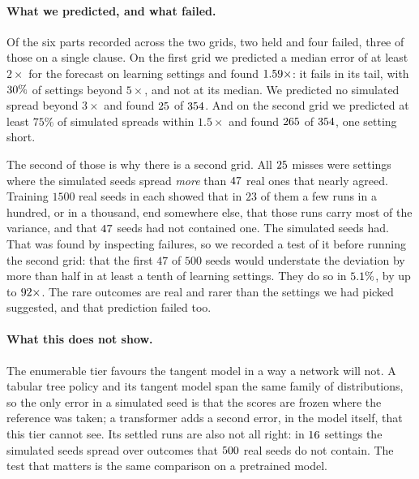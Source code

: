 \paragraph{What we predicted, and what failed.} Of the six parts recorded across the two
grids, two held and four failed, three of those on a single clause. On the first grid we predicted a median
error of at least $2\times$ for the forecast on learning settings and found
$1.59\times$: it fails in its tail, with $30\%$ of settings
beyond $5\times$, and not at its median. We predicted no simulated spread beyond $3\times$ and
found $25$ of $354$. And on the second grid we
predicted at least $75\%$ of simulated spreads within $1.5\times$ and found
$265$ of $354$, one setting short.

The second of those is why there is a second grid. All $25$ misses
were settings where the simulated seeds spread \emph{more} than $47$ real ones that
nearly agreed. Training $1500$ real seeds in each showed that in $23$ of them a few runs in a
hundred, or in a thousand, end somewhere else, that those runs carry most of the variance, and
that $47$ seeds had not contained one. The simulated seeds had. That was found by
inspecting failures, so we recorded a test of it before running the second grid: that the first
$47$ of $500$ seeds would understate the deviation by more than half in at least a tenth of
learning settings. They do so in $5.1\%$, by up to
$92\times$. The rare outcomes are real and rarer than the settings
we had picked suggested, and that prediction failed too.

\paragraph{What this does not show.} The enumerable tier favours the tangent model in a way a
network will not. A tabular tree policy and its tangent model span the same family of
distributions, so the only error in a simulated seed is that the scores are frozen where the
reference was taken; a transformer adds a second error, in the model itself, that this tier cannot
see. Its settled runs are also not all right: in $16$ settings the simulated
seeds spread over outcomes that $500$ real seeds do not contain. The test that
matters is the same comparison on a pretrained model.

